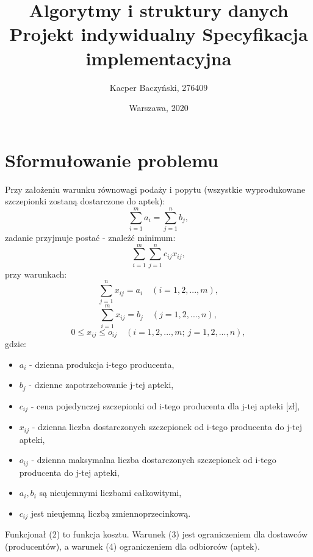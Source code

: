 \documentclass[11pt]{article}
\title{Algorytmy i struktury danych
\\Projekt indywidualny
\bigbreak Specyfikacja implementacyjna}
\author{Kacper Baczyński, 276409}
\date{Warszawa, 2020}
\begin{document}
\maketitle

\section{Sformułowanie problemu}
Przy założeniu warunku równowagi podaży i popytu (wszystkie wyprodukowane szczepionki zostaną dostarczone do aptek):
\begin{equation}
    \sum\limits_{i=1}^{m} a_{i} = \sum\limits_{j=1}^n b_{j},
\end{equation}
zadanie przyjmuje postać - znaleźć minimum:
\begin{equation}
    \sum\limits_{i=1}^{m}\sum\limits_{j=1}^{n}c_{ij}x_{ij},
\end{equation}
przy warunkach:
\begin{equation}
    \sum\limits_{j=1}^{n} x_{ij} = a_{i} \quad (i = 1, 2,..., m),
\end{equation}
\begin{equation}
    \sum\limits_{i=1}^{m} x_{ij} = b_{j} \quad (j = 1, 2,..., n),
\end{equation}
\begin{equation}
    0 \leq x_{ij} \leq o_{ij} \quad (i = 1, 2,..., m; \ j = 1, 2,..., n),
\end{equation}
gdzie:
\begin{itemize}
    \item $ a_{i} $ - dzienna produkcja i-tego producenta,
    \item $ b_{j} $ - dzienne zapotrzebowanie j-tej apteki,
    \item $ c_{ij} $ - cena pojedynczej szczepionki od i-tego producenta dla j-tej apteki [zł],
    \item $ x_{ij} $ - dzienna liczba dostarczonych szczepionek od i-tego producenta do j-tej apteki,
    \item $ o_{ij} $ - dzienna maksymalna liczba dostarczonych szczepionek od i-tego producenta do j-tej apteki,
    \item $ a_{i}, b_{i} $ są nieujemnymi liczbami całkowitymi,
    \item $ c_{ij} $ jest nieujemną liczbą zmiennoprzecinkową.
\end{itemize}
Funkcjonał (2) to funkcja kosztu. Warunek (3) jest ograniczeniem dla dostawców (producentów), a warunek (4) ograniczeniem dla odbiorców (aptek).
\end{document}
